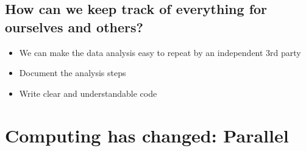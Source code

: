 \documentclass[letterpaper,10pt,english]{sphinxmanual}
\begin{document}
\section{How can we keep track of everything for ourselves and others?}
\label{\detokenize{01-Introduction:how-can-we-keep-track-of-everything-for-ourselves-and-others}}\begin{itemize}
\item {} 
\sphinxAtStartPar
We can make the data analysis easy to repeat by an independent 3rd party

\item {} 
\sphinxAtStartPar
Document the analysis steps

\item {} 
\sphinxAtStartPar
Write clear and understandable code

\end{itemize}


\chapter{Computing has changed: Parallel}
\label{\detokenize{01-Introduction:computing-has-changed-parallel}}
\end{document}
